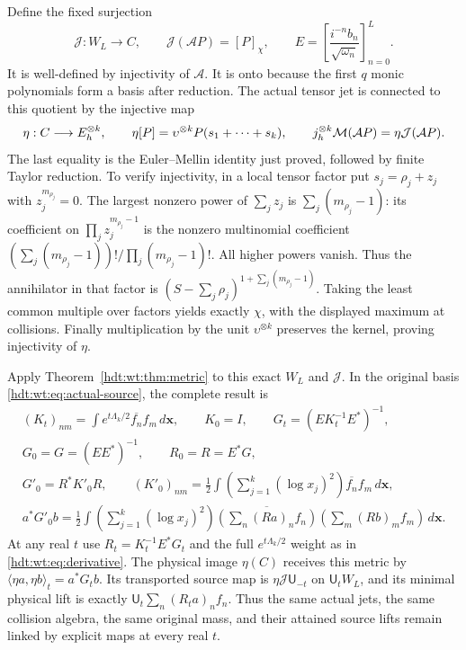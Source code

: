 Define the fixed surjection
\begin{equation}\label{hdt:wt:eq:actual-jet}
 \mathcal J:W_L\longrightarrow C,\qquad
 \mathcal J(\mathcal AP)=[P]_\chi,\qquad
 E=\left[\frac{i^{-n}b_n}{\sqrt{\omega_n}}\right]_{n=0}^L.
\end{equation}
It is well-defined by injectivity of $\mathcal A$.  It is onto
because the first $q$ monic polynomials form a basis after
reduction.  The actual tensor jet is connected to this quotient
by the injective map
\begin{equation}\label{hdt:wt:eq:eta}
 \eta:C\longrightarrow E_h^{\otimes k},\qquad
 \eta[P]=\upsilon^{\otimes k}P(s_1+\cdots+s_k),\qquad
 j_h^{\otimes k}\mathcal M(\mathcal AP)=\eta\mathcal J(\mathcal AP).
\end{equation}
The last equality is the Euler--Mellin identity just proved,
followed by finite Taylor reduction.  To verify injectivity,
in a local tensor factor put $s_j=\rho_j+z_j$ with
$z_j^{m_{\rho_j}}=0$.  The largest nonzero power of $\sum_jz_j$
is $\sum_j(m_{\rho_j}-1)$: its coefficient on
$\prod_jz_j^{m_{\rho_j}-1}$ is the nonzero multinomial
coefficient
$(\sum_j(m_{\rho_j}-1))!/\prod_j(m_{\rho_j}-1)!$.
All higher powers vanish.  Thus the annihilator in that factor
is $(S-\sum_j\rho_j)^{1+\sum_j(m_{\rho_j}-1)}$.
Taking the least common multiple over factors yields exactly
$\chi$, with the displayed maximum at collisions.  Finally
multiplication by the unit $\upsilon^{\otimes k}$ preserves
the kernel, proving injectivity of $\eta$.

Apply Theorem~\ref{hdt:wt:thm:metric} to this exact $W_L$ and
$\mathcal J$.  In the original basis \eqref{hdt:wt:eq:actual-source},
the complete result is
\begin{equation}\label{hdt:wt:eq:actual-derivative}
 \begin{gathered}
 (K_t)_{nm}=\int e^{t\Lambda_k/2}\overline{f_n}f_m\,d\mathbf x,
 \qquad K_0=I,\qquad
 G_t=(EK_t^{-1}E^*)^{-1},\\
 G_0=G=(EE^*)^{-1},\qquad R_0=R=E^*G,\\
 G'_0=R^*K'_0R,\qquad
 (K'_0)_{nm}=\frac12\int\left(\sum_{j=1}^k(\log x_j)^2\right)
                          \overline{f_n}f_m\,d\mathbf x,\\
 a^*G'_0b=\frac12\int\left(\sum_{j=1}^k(\log x_j)^2\right)
 \overline{\left(\sum_n(Ra)_nf_n\right)}
             \left(\sum_m(Rb)_mf_m\right)\,d\mathbf x.
 \end{gathered}
\end{equation}
At any real $t$ use $R_t=K_t^{-1}E^*G_t$ and the full
$e^{t\Lambda_k/2}$ weight as in \eqref{hdt:wt:eq:derivative}.
The physical image $\eta(C)$ receives this metric by
$\langle\eta a,\eta b\rangle_t=a^*G_tb$.  Its transported
source map is $\eta\mathcal J\mathsf U_{-t}$ on
$\mathsf U_tW_L$, and its minimal physical lift is exactly
$\mathsf U_t\sum_n(R_ta)_nf_n$.  Thus the same actual jets,
the same collision algebra, the same original mass, and their
attained source lifts remain linked by explicit maps at every
real $t$.

